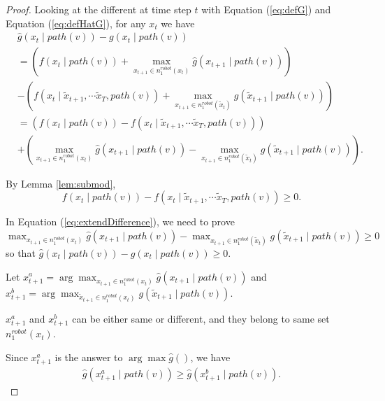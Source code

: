 \documentclass[12pt]{article}
\begin{document}
\begin{lem}
\begin{proof}
Looking at the different at time step $ t $ with Equation (\ref{eq:defG}) and Equation (\ref{eq:defHatG}), for any $ x_{t} $ we have
\begin{equation}
\label{eq:extendDifference}
\begin{aligned}
& \hat{g}(x_{t} \mid path(v)) - g(x_{t} \mid path(v)) \\
& = ( f(x_{t} \mid path(v)) + \max_{x_{t+1} \in n^{robot}_{1}(x_{t})} \hat{g}(x_{t+1} \mid path(v)) ) \\
& - ( f(x_{t} \mid \tilde{x}_{t+1}, \cdots \tilde{x}_{T}, path(v)) + \max_{x_{t+1} \in n^{robot}_{1}(\tilde{x}_{t})} g(\tilde{x}_{t+1} \mid path(v)) ) \\
& = ( f(x_{t} \mid path(v)) - f(x_{t} \mid \tilde{x}_{t+1}, \cdots \tilde{x}_{T}, path(v)) ) \\
& + ( \max_{x_{t+1} \in n^{robot}_{1}(x_{t})} \hat{g}(x_{t+1} \mid path(v)) - \max_{x_{t+1} \in n^{robot}_{1}(\tilde{x}_{t})} g(\tilde{x}_{t+1} \mid path(v)) ).
\end{aligned}
\end{equation} 

By Lemma \ref{lem:submod}, 
\begin{equation}
\label{eq:inductionGEQ1}
f(x_{t} \mid path(v)) - f(x_{t} \mid \tilde{x}_{t+1}, \cdots \tilde{x}_{T}, path(v)) \geq 0 .
\end{equation}

In Equation (\ref{eq:extendDifference}), we need to prove $ \max_{x_{t+1} \in n^{robot}_{1}(x_{t})} \hat{g}(x_{t+1} \mid path(v)) - \max_{x_{t+1} \in n^{robot}_{1}(\tilde{x}_{t})} g(\tilde{x}_{t+1} \mid path(v))  \geq 0 $ so that $ \hat{g}(x_{t} \mid path(v)) - g(x_{t} \mid path(v)) \geq 0 $.

Let $ x^{a}_{t+1} = \arg \max_{x_{t+1} \in n^{robot}_{1}(x_{t})} \hat{g}(x_{t+1} \mid path(v))  $ and $ x^{b}_{t+1} = \arg \max_{\tilde{x}_{t+1} \in n^{robot}_{1}(x_{t})} g(\tilde{x}_{t+1} \mid path(v)) $.

$ x^{a}_{t+1} $ and $ x^{b}_{t+1} $ can be either same or different, and they belong to same set $  n^{robot}_{1}(x_{t}) $.

Since $ x^{a}_{t+1} $ is the answer to $ \arg \max \hat{g}() $, we have
\begin{equation}
\label{eq:bigger1}
\begin{aligned}
\hat{g}(x^{a}_{t+1} \mid path(v)) \geq \hat{g}(x^{b}_{t+1} \mid path(v)).
\end{aligned}
\end{equation}



\end{proof}
\end{lem}
\end{document}
